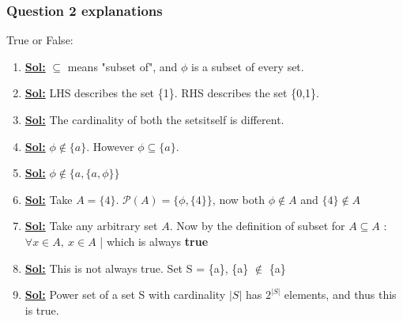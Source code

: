 \documentclass[xcolor=svgnames]{beamer}
\begin{document}
\begin{frame}
\frametitle{Question 2 explanations}

True or False:

\begin{enumerate}
    \item \textbf{\underline{Sol:}} $\subseteq$ means "subset of", and $\phi$ is a subset of every set.
    \item \textbf{\underline{Sol:}} LHS describes the set \{1\}. RHS describes the set \{0,1\}. 
    \item \textbf{\underline{Sol:}} The cardinality of both the setsitself is different.
    \item \textbf{\underline{Sol:}} $\phi \notin \{a\}$. However $\phi \subseteq \{a\}$. 
    \item \textbf{\underline{Sol:}} $\phi \notin \{a, \{a, \phi\}\}$
    \item \textbf{\underline{Sol:}} Take $A = \{4\}$. $\mathcal{P}(A) = \{\phi, \{4\}\}$, now both $\phi \notin A$ and $\{4\} \notin A$
    \item \textbf{\underline{Sol:}} Take any arbitrary set $A$. Now by the definition of subset for $A \subseteq A$ : $\forall x \in A,\ x \in A$ | which is always \textbf{true} 
    \item \textbf{\underline{Sol:}} This is not always true. Set S = \{a\}, \{a\} $\notin$ \{a\}
    \item \textbf{\underline{Sol:}} Power set of a set S with cardinality $|S|$ has $2^{|S|}$ elements, and thus this is true.
\end{enumerate}
\end{frame}

\end{document}
